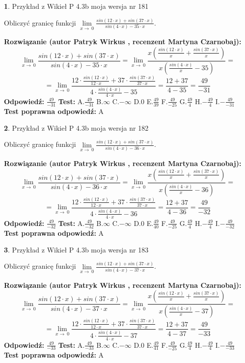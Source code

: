 \documentclass[12pt, a4paper]{article}
\theoremstyle{definition} %
\newtheorem{zad}{}
\newcommand{\zadStart}[1]{\begin{zad}#1\newline}
\newcommand{\zadStop}{\end{zad}}
\newcommand{\rozwStart}[2]{\noindent \textbf{Rozwiązanie (autor #1 , recenzent #2): }\newline}
\newcommand{\rozwStop}{\newline}
\newcommand{\odpStart}{\noindent \textbf{Odpowiedź:}\newline}
\newcommand{\odpStop}{\newline}
\newcommand{\testStart}{\noindent \textbf{Test:}\newline}
\newcommand{\testStop}{\newline}
\newcommand{\kluczStart}{\noindent \textbf{Test poprawna odpowiedź:}\newline}
\newcommand{\kluczStop}{\newline}
\begin{document}
\zadStart{Przykład z Wikieł P 4.3b moja wersja nr 181}


Obliczyć granicę funkcji $\lim\limits_{x\to\ 0}\frac{sin(12 \cdot x)+sin(37 \cdot x)}{sin(4 \cdot x)-35 \cdot x}$.
\zadStop
\rozwStart{Patryk Wirkus}{Martyna Czarnobaj}
$$\lim\limits_{x\to\ 0}\frac{sin(12 \cdot x)+sin(37 \cdot x)}{sin(4 \cdot x)-35 \cdot x}=\lim\limits_{x\to\ 0}\frac{x(\frac{sin(12 \cdot x)}{x}+\frac{sin(37 \cdot x)}{x})}{x(\frac{sin(4 \cdot x)}{x}-35)}=$$
$$=\lim\limits_{x\to\ 0}\frac{12 \cdot \frac{sin(12 \cdot x)}{12 \cdot x}+37 \cdot \frac{sin(37 \cdot x)}{37 \cdot x}}{4 \cdot \frac{sin(4 \cdot x)}{4 \cdot x}-35}=\frac{12+37}{4-35} = \frac{49}{-31}$$
\rozwStop
\odpStart
$\frac{49}{-31}$
\odpStop
\testStart
A.$\frac{49}{-31}$
B.$\infty$
C.$-\infty$
D.$0$
E.$\frac{49}{39}$
F.$\frac{49}{-25}$
G.$\frac{49}{4}$
H.$-\frac{49}{4}$
I.$-\frac{49}{-31}$
\testStop
\kluczStart
A
\kluczStop



\zadStart{Przykład z Wikieł P 4.3b moja wersja nr 182}


Obliczyć granicę funkcji $\lim\limits_{x\to\ 0}\frac{sin(12 \cdot x)+sin(37 \cdot x)}{sin(4 \cdot x)-36 \cdot x}$.
\zadStop
\rozwStart{Patryk Wirkus}{Martyna Czarnobaj}
$$\lim\limits_{x\to\ 0}\frac{sin(12 \cdot x)+sin(37 \cdot x)}{sin(4 \cdot x)-36 \cdot x}=\lim\limits_{x\to\ 0}\frac{x(\frac{sin(12 \cdot x)}{x}+\frac{sin(37 \cdot x)}{x})}{x(\frac{sin(4 \cdot x)}{x}-36)}=$$
$$=\lim\limits_{x\to\ 0}\frac{12 \cdot \frac{sin(12 \cdot x)}{12 \cdot x}+37 \cdot \frac{sin(37 \cdot x)}{37 \cdot x}}{4 \cdot \frac{sin(4 \cdot x)}{4 \cdot x}-36}=\frac{12+37}{4-36} = \frac{49}{-32}$$
\rozwStop
\odpStart
$\frac{49}{-32}$
\odpStop
\testStart
A.$\frac{49}{-32}$
B.$\infty$
C.$-\infty$
D.$0$
E.$\frac{49}{40}$
F.$\frac{49}{-25}$
G.$\frac{49}{4}$
H.$-\frac{49}{4}$
I.$-\frac{49}{-32}$
\testStop
\kluczStart
A
\kluczStop



\zadStart{Przykład z Wikieł P 4.3b moja wersja nr 183}


Obliczyć granicę funkcji $\lim\limits_{x\to\ 0}\frac{sin(12 \cdot x)+sin(37 \cdot x)}{sin(4 \cdot x)-37 \cdot x}$.
\zadStop
\rozwStart{Patryk Wirkus}{Martyna Czarnobaj}
$$\lim\limits_{x\to\ 0}\frac{sin(12 \cdot x)+sin(37 \cdot x)}{sin(4 \cdot x)-37 \cdot x}=\lim\limits_{x\to\ 0}\frac{x(\frac{sin(12 \cdot x)}{x}+\frac{sin(37 \cdot x)}{x})}{x(\frac{sin(4 \cdot x)}{x}-37)}=$$
$$=\lim\limits_{x\to\ 0}\frac{12 \cdot \frac{sin(12 \cdot x)}{12 \cdot x}+37 \cdot \frac{sin(37 \cdot x)}{37 \cdot x}}{4 \cdot \frac{sin(4 \cdot x)}{4 \cdot x}-37}=\frac{12+37}{4-37} = \frac{49}{-33}$$
\rozwStop
\odpStart
$\frac{49}{-33}$
\odpStop
\testStart
A.$\frac{49}{-33}$
B.$\infty$
C.$-\infty$
D.$0$
E.$\frac{49}{41}$
F.$\frac{49}{-25}$
G.$\frac{49}{4}$
H.$-\frac{49}{4}$
I.$-\frac{49}{-33}$
\testStop
\kluczStart
A
\kluczStop
\end{document}
